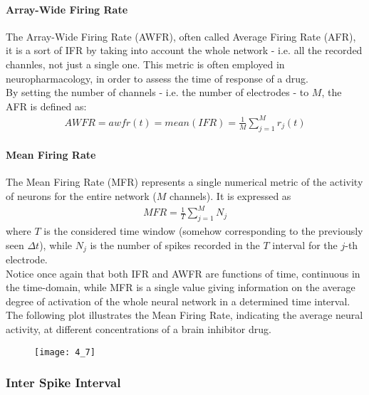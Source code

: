 \paragraph{Array-Wide Firing Rate}
The Array-Wide Firing Rate (AWFR), often called Average Firing Rate (AFR), it is a sort of
IFR by taking into account the whole network - i.e. all the recorded channles, not just a single one.
This metric is often employed in neuropharmacology, in order to assess the time of response of a drug.\\
By setting the number of channels - i.e. the number of electrodes - to \(M\), the AFR is defined as:
\begin{align*}
    AWFR=awfr(t)=mean(IFR)=\frac{1}{M}\sum_{j=1}^{M}r_{j}(t)
\end{align*}
\paragraph{Mean Firing Rate}
The Mean Firing Rate (MFR) represents a single numerical metric of the activity of neurons for the
entire network (\(M\) channels). It is expressed as
\begin{align*}
    MFR=\frac{1}{T}\sum_{j=1}^{M}N_j
\end{align*}
where \(T\) is the considered time window (somehow corresponding to the previously seen \(\Delta{t}\)),
while \(N_j\) is the number of spikes recorded in the \(T\) interval for the \(j\)-th electrode.\\
Notice once again that both IFR and AWFR are functions of time, continuous in the time-domain, while
MFR is a single value giving information on the average degree of activation of the whole neural
network in a determined time interval.\\
The following plot illustrates the Mean Firing Rate, indicating the average neural activity, at
different concentrations of a brain inhibitor drug.
\begin{figure}[H]
    \texttt{[image: 4\_7]}
    \centering
\end{figure}
\subsubsection{Inter Spike Interval}
